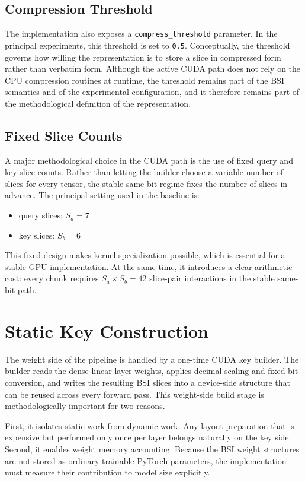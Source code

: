 \subsection{Compression Threshold}
The implementation also exposes a \texttt{compress\_threshold} parameter. In the principal experiments, this threshold is set to \texttt{0.5}. Conceptually, the threshold governs how willing the representation is to store a slice in compressed form rather than verbatim form. Although the active CUDA path does not rely on the CPU compression routines at runtime, the threshold remains part of the BSI semantics and of the experimental configuration, and it therefore remains part of the methodological definition of the representation.

\subsection{Fixed Slice Counts}
A major methodological choice in the CUDA path is the use of fixed query and key slice counts. Rather than letting the builder choose a variable number of slices for every tensor, the stable same-bit regime fixes the number of slices in advance. The principal setting used in the baseline is:

\begin{itemize}[leftmargin=2em]
\item query slices: \(S_a = 7\)
\item key slices: \(S_b = 6\)
\end{itemize}

This fixed design makes kernel specialization possible, which is essential for a stable GPU implementation. At the same time, it introduces a clear arithmetic cost: every chunk requires \(S_a \times S_b = 42\) slice-pair interactions in the stable same-bit path.

\section{Static Key Construction}
The weight side of the pipeline is handled by a one-time CUDA key builder. The builder reads the dense linear-layer weights, applies decimal scaling and fixed-bit conversion, and writes the resulting BSI slices into a device-side structure that can be reused across every forward pass. This weight-side build stage is methodologically important for two reasons.

First, it isolates static work from dynamic work. Any layout preparation that is expensive but performed only once per layer belongs naturally on the key side. Second, it enables weight memory accounting. Because the BSI weight structures are not stored as ordinary trainable PyTorch parameters, the implementation must measure their contribution to model size explicitly.

